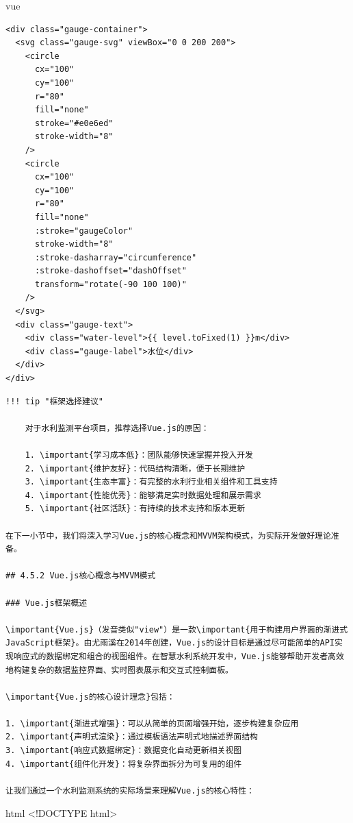 vue

\begin{verbatim}
<div class="gauge-container">
  <svg class="gauge-svg" viewBox="0 0 200 200">
    <circle 
      cx="100" 
      cy="100" 
      r="80" 
      fill="none" 
      stroke="#e0e6ed" 
      stroke-width="8"
    />
    <circle 
      cx="100" 
      cy="100" 
      r="80" 
      fill="none" 
      :stroke="gaugeColor" 
      stroke-width="8"
      :stroke-dasharray="circumference"
      :stroke-dashoffset="dashOffset"
      transform="rotate(-90 100 100)"
    />
  </svg>
  <div class="gauge-text">
    <div class="water-level">{{ level.toFixed(1) }}m</div>
    <div class="gauge-label">水位</div>
  </div>
</div>
\end{verbatim}

\begin{lstlisting}
!!! tip "框架选择建议"
    
    对于水利监测平台项目，推荐选择Vue.js的原因：
    
    1. \important{学习成本低}：团队能够快速掌握并投入开发
    2. \important{维护友好}：代码结构清晰，便于长期维护
    3. \important{生态丰富}：有完整的水利行业相关组件和工具支持
    4. \important{性能优秀}：能够满足实时数据处理和展示需求
    5. \important{社区活跃}：有持续的技术支持和版本更新

在下一小节中，我们将深入学习Vue.js的核心概念和MVVM架构模式，为实际开发做好理论准备。

## 4.5.2 Vue.js核心概念与MVVM模式

### Vue.js框架概述

\important{Vue.js}（发音类似"view"）是一款\important{用于构建用户界面的渐进式JavaScript框架}。由尤雨溪在2014年创建，Vue.js的设计目标是通过尽可能简单的API实现响应式的数据绑定和组合的视图组件。在智慧水利系统开发中，Vue.js能够帮助开发者高效地构建复杂的数据监控界面、实时图表展示和交互式控制面板。

\important{Vue.js的核心设计理念}包括：

1. \important{渐进式增强}：可以从简单的页面增强开始，逐步构建复杂应用
2. \important{声明式渲染}：通过模板语法声明式地描述界面结构
3. \important{响应式数据绑定}：数据变化自动更新相关视图
4. \important{组件化开发}：将复杂界面拆分为可复用的组件

让我们通过一个水利监测系统的实际场景来理解Vue.js的核心特性：

\end{lstlisting}

html \textless!DOCTYPE html\textgreater{}

